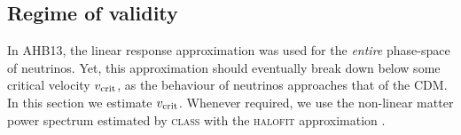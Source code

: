 \documentclass[useAMS, usenatbib]{mnras}
\newcommand{\beq}{\begin{equation}}
\newcommand{\eeq}{\end{equation}}
\newcommand{\earr}{\end{eqnarray}}
\newcommand{\bs}{\boldsymbol}
\newcommand{\spb}[1]{{\textcolor{green}{[{\bf SPB}: #1]}}}
\begin{document}
%

%


\subsection{Regime of validity} \label{sec:validity}

In AHB13, the linear response approximation was used for the \emph{entire} phase-space of neutrinos. Yet, this approximation should eventually break down below some critical velocity $v_{\rm crit}$, as the behaviour of neutrinos approaches that of the CDM. In this section we estimate $v_{\rm crit}$. Whenever required, we use the non-linear matter power spectrum estimated by \textsc{class} \citep{Lesgourgues_11, Blas_11} with the \textsc{halofit} approximation \citep{Smith_2003}.
\end{document}
